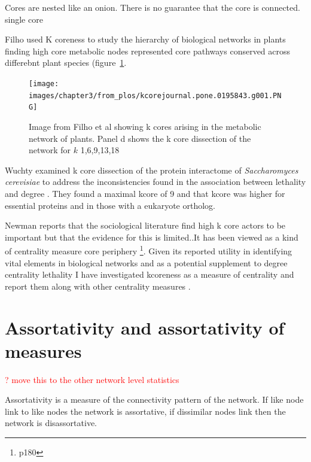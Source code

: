 Cores are nested like an onion. There is no guarantee that the core is connected. single core

Filho used K coreness to study the hierarchy of biological networks in plants finding high core metabolic nodes represented core pathways conserved across differebnt plant species\cite{filho2018hierarchical} (figure~\ref{fig:kcore from Filho}. 

\begin{figure}
    \centering
    \texttt{[image: images/chapter3/from\_plos/kcorejournal.pone.0195843.g001.PNG]}
    \caption{Image from Filho et al \cite{filho2018hierarchical} showing k cores arising in the metabolic network of plants. Panel d shows the k core dissection of the network for $k$ {1,6,9,13,18}}
    \label{fig:kcore from Filho}
\end{figure}

Wuchty examined k core dissection of the protein interactome of \textit{Saccharomyces cerevisiae} to address the inconsistencies found in the association between lethality and degree . They found a maximal kcore of 9 and that kcore was higher for essential proteins and in those with a eukaryote ortholog\cite{wuchty2005peeling}.

Newman reports that the sociological literature find high k core actors to be important but that the evidence for this is limited.\cite{newman2018networks}.It has been viewed as a kind of centrality measure core periphery \cite{newman2018networks}\footnote{p180}. Given its reported utility in identifying vital elements in biological networks and as a potential supplement to degree centrality lethality\cite{wuchty2005peeling} I have investigated kcoreness as a measure of centrality and report them along with other centrality measures .








\section{Assortativity and assortativity of measures}
\label{sec:assortativity}
\textcolor{red}{? move this to the other network level statistics}

Assortativity is a measure of the connectivity pattern of the network. If like node link to like nodes the network is assortative, if dissimilar nodes link then the network is disassortative. 

